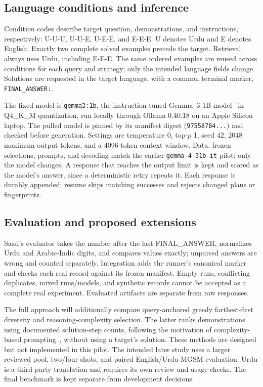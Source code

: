 \documentclass[conference]{IEEEtran}
\begin{document}
\subsection{Language conditions and inference}
Condition codes describe target question, demonstrations, and instructions, respectively: U-U-U, U-U-E, U-E-E, and E-E-E. U denotes Urdu and E denotes English. Exactly two complete solved examples precede the target. Retrieval always uses Urdu, including E-E-E. The same ordered examples are reused across conditions for each query and strategy; only the intended language fields change. Solutions are requested in the target language, with a common terminal marker, \texttt{FINAL\_ANSWER:}.

The fixed model is \texttt{gemma3:1b}, the instruction-tuned Gemma~3 1B model~\cite{gemma} in Q4\_K\_M quantization, run locally through Ollama 0.40.18 on an Apple Silicon laptop. The pulled model is pinned by its manifest digest (\texttt{97558784...}) and checked before generation. Settings are temperature 0, top-$p$ 1, seed 42, 2048 maximum output tokens, and a 4096-token context window. Data, frozen selections, prompts, and decoding match the earlier \texttt{gemma-4-31b-it} pilot; only the model changes. A response that reaches the output limit is kept and scored as the model's answer, since a deterministic retry repeats it. Each response is durably appended; resume skips matching successes and rejects changed plans or fingerprints.

\subsection{Evaluation and proposed extensions}
Saad's evaluator takes the number after the last FINAL\_ANSWER, normalizes Urdu and Arabic-Indic digits, and compares values exactly; unparsed answers are wrong and counted separately. Integration adds the runner's canonical marker and checks each real record against its frozen manifest. Empty runs, conflicting duplicates, mixed runs/models, and synthetic records cannot be accepted as a complete real experiment. Evaluated artifacts are separate from raw responses.

The full approach will additionally compare query-anchored greedy farthest-first diversity and reasoning-complexity selection. The latter ranks demonstrations using documented solution-step counts, following the motivation of complexity-based prompting~\cite{fu}, without using a target's solution. These methods are designed but not implemented in this pilot. The intended later study uses a larger reviewed pool, two/four shots, and paired English/Urdu MGSM evaluation. Urdu is a third-party translation and requires its own review and usage checks. The final benchmark is kept separate from development decisions.
\end{document}
